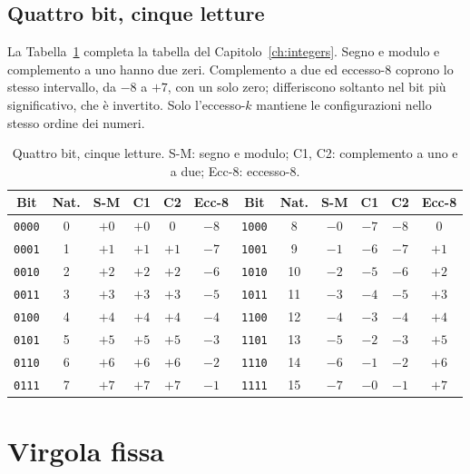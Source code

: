 \subsection{Quattro bit, cinque letture}

La Tabella~\ref{tab:real:five} completa la tabella del
Capitolo~\ref{ch:integers}. Segno e modulo e complemento a uno hanno due zeri.
Complemento a due ed eccesso-8 coprono lo stesso intervallo, da $-8$ a $+7$,
con un solo zero; differiscono soltanto nel bit più significativo, che è
invertito. Solo l'eccesso-$k$ mantiene le configurazioni nello stesso ordine
dei numeri.

\begin{table}[htb]
\centering\small
\caption{Quattro bit, cinque letture. S-M: segno e modulo; C1, C2: complemento a uno e a due; Ecc-8: eccesso-8.}\label{tab:real:five}
\setlength{\tabcolsep}{4.5pt}
\begin{tabular}{@{}cccccc@{\qquad}cccccc@{}}
\toprule
\textbf{Bit} & \textbf{Nat.} & \textbf{S-M} & \textbf{C1} & \textbf{C2} & \textbf{Ecc-8} &
\textbf{Bit} & \textbf{Nat.} & \textbf{S-M} & \textbf{C1} & \textbf{C2} & \textbf{Ecc-8}\\
\midrule
\texttt{0000} & 0 & $+0$ & $+0$ & 0 & $-8$ & \texttt{1000} & 8 & $-0$ & $-7$ & $-8$ & 0\\
\texttt{0001} & 1 & $+1$ & $+1$ & $+1$ & $-7$ & \texttt{1001} & 9 & $-1$ & $-6$ & $-7$ & $+1$\\
\texttt{0010} & 2 & $+2$ & $+2$ & $+2$ & $-6$ & \texttt{1010} & 10 & $-2$ & $-5$ & $-6$ & $+2$\\
\texttt{0011} & 3 & $+3$ & $+3$ & $+3$ & $-5$ & \texttt{1011} & 11 & $-3$ & $-4$ & $-5$ & $+3$\\
\texttt{0100} & 4 & $+4$ & $+4$ & $+4$ & $-4$ & \texttt{1100} & 12 & $-4$ & $-3$ & $-4$ & $+4$\\
\texttt{0101} & 5 & $+5$ & $+5$ & $+5$ & $-3$ & \texttt{1101} & 13 & $-5$ & $-2$ & $-3$ & $+5$\\
\texttt{0110} & 6 & $+6$ & $+6$ & $+6$ & $-2$ & \texttt{1110} & 14 & $-6$ & $-1$ & $-2$ & $+6$\\
\texttt{0111} & 7 & $+7$ & $+7$ & $+7$ & $-1$ & \texttt{1111} & 15 & $-7$ & $-0$ & $-1$ & $+7$\\
\bottomrule
\end{tabular}
\end{table}

\section{Virgola fissa}


